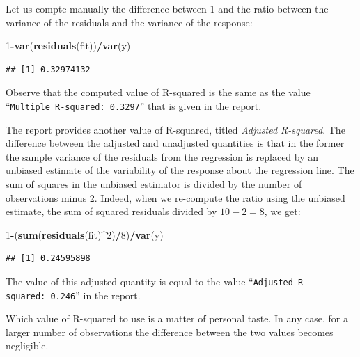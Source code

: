 \documentclass[]{krantz}
\makeatletter
\newenvironment{Shaded}{\begin{snugshade}}{\end{snugshade}}
\newcommand{\DecValTok}[1]{\textcolor[rgb]{0.00,0.00,0.81}{#1}}
\newcommand{\KeywordTok}[1]{\textcolor[rgb]{0.13,0.29,0.53}{\textbf{#1}}}
\newcommand{\NormalTok}[1]{#1}
\newcommand{\OperatorTok}[1]{\textcolor[rgb]{0.81,0.36,0.00}{\textbf{#1}}}
\newenvironment{kframe}{%
\medskip{}
\setlength{\fboxsep}{.8em}
 \def\at@end@of@kframe{}%
 \ifinner\ifhmode%
  \def\at@end@of@kframe{\end{minipage}}%
  \begin{minipage}{\columnwidth}%
 \fi\fi%
 \def\FrameCommand##1{\hskip\@totalleftmargin \hskip-\fboxsep
 \colorbox{shadecolor}{##1}\hskip-\fboxsep
     \hskip-\linewidth \hskip-\@totalleftmargin \hskip\columnwidth}%
 \MakeFramed {\advance\hsize-\width
   \@totalleftmargin\z@ \linewidth\hsize
   \@setminipage}}%
 {\par\unskip\endMakeFramed%
 \at@end@of@kframe}
\renewenvironment{Shaded}{\begin{kframe}}{\end{kframe}}
\theoremstyle{definition}
\theoremstyle{definition}
\theoremstyle{definition}
\theoremstyle{remark}
\makeatother
\begin{document}
Let us compte manually the difference between 1 and the ratio between
the variance of the residuals and the variance of the response:

\begin{Shaded}
\begin{Highlighting}[]
\DecValTok{1}\OperatorTok{-}\KeywordTok{var}\NormalTok{(}\KeywordTok{residuals}\NormalTok{(fit))}\OperatorTok{/}\KeywordTok{var}\NormalTok{(y)}
\end{Highlighting}
\end{Shaded}

\begin{verbatim}
## [1] 0.32974132
\end{verbatim}

Observe that the computed value of R-squared is the same as the value
``\texttt{Multiple\ R-squared:\ 0.3297}'' that is given in the report.

The report provides another value of R-squared, titled \emph{Adjusted
R-squared}. The difference between the adjusted and unadjusted
quantities is that in the former the sample variance of the residuals
from the regression is replaced by an unbiased estimate of the
variability of the response about the regression line. The sum of
squares in the unbiased estimator is divided by the number of
observations minus 2. Indeed, when we re-compute the ratio using the
unbiased estimate, the sum of squared residuals divided by \(10 - 2 = 8\),
we get:

\begin{Shaded}
\begin{Highlighting}[]
\DecValTok{1}\OperatorTok{-}\NormalTok{(}\KeywordTok{sum}\NormalTok{(}\KeywordTok{residuals}\NormalTok{(fit)}\OperatorTok{^}\DecValTok{2}\NormalTok{)}\OperatorTok{/}\DecValTok{8}\NormalTok{)}\OperatorTok{/}\KeywordTok{var}\NormalTok{(y)}
\end{Highlighting}
\end{Shaded}

\begin{verbatim}
## [1] 0.24595898
\end{verbatim}

The value of this adjusted quantity is equal to the value
``\texttt{Adjusted\ R-squared:\ 0.246}'' in the report.

Which value of R-squared to use is a matter of personal taste. In any
case, for a larger number of observations the difference between the two
values becomes negligible.
\end{document}
